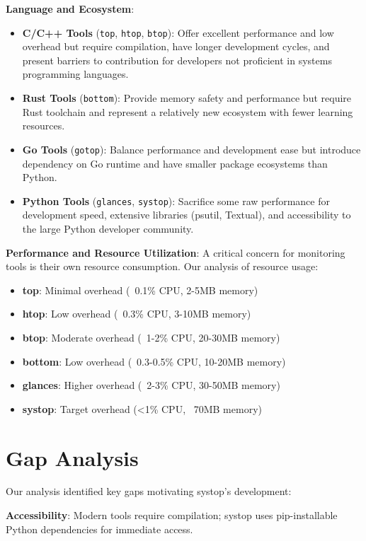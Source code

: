 \documentclass[12pt,a4paper,oneside]{report}
\begin{document}
\textbf{Language and Ecosystem}:
\begin{itemize}
    \item \textbf{C/C++ Tools} (\texttt{top}, \texttt{htop}, \texttt{btop}): Offer excellent performance and low overhead but require compilation, have longer development cycles, and present barriers to contribution for developers not proficient in systems programming languages.
    \item \textbf{Rust Tools} (\texttt{bottom}): Provide memory safety and performance but require Rust toolchain and represent a relatively new ecosystem with fewer learning resources.
    \item \textbf{Go Tools} (\texttt{gotop}): Balance performance and development ease but introduce dependency on Go runtime and have smaller package ecosystems than Python.
    \item \textbf{Python Tools} (\texttt{glances}, \texttt{systop}): Sacrifice some raw performance for development speed, extensive libraries (psutil, Textual), and accessibility to the large Python developer community.
\end{itemize}

\textbf{Performance and Resource Utilization}: A critical concern for monitoring tools is their own resource consumption. Our analysis of resource usage:

\begin{itemize}
    \item \textbf{top}: Minimal overhead (~0.1\% CPU, 2-5MB memory)
    \item \textbf{htop}: Low overhead (~0.3\% CPU, 3-10MB memory)
    \item \textbf{btop}: Moderate overhead (~1-2\% CPU, 20-30MB memory)
    \item \textbf{bottom}: Low overhead (~0.3-0.5\% CPU, 10-20MB memory)
    \item \textbf{glances}: Higher overhead (~2-3\% CPU, 30-50MB memory)
    \item \textbf{systop}: Target overhead (<1\% CPU, ~70MB memory)
\end{itemize}

\section{Gap Analysis}
\label{sec:gap-analysis}

Our analysis identified key gaps motivating systop's development:

\textbf{Accessibility}: Modern tools require compilation; systop uses pip-installable Python dependencies for immediate access.
\end{document}
